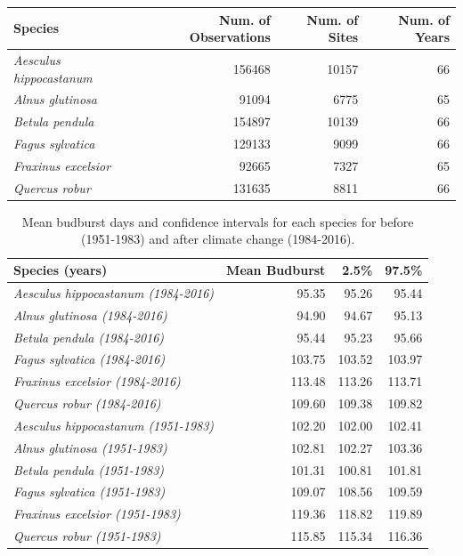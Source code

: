 \documentclass{article}\usepackage[]{graphicx}\usepackage[]{color}
\begin{document}
\begin{center}
 \label{tab:spp} 
\begin{tabular}{l r r r}
\hline
Species & Num. of Observations & Num. of Sites & Num. of Years \\
\hline
\textit{Aesculus hippocastanum} & 156468 & 10157 & 66  \\
\textit{Alnus glutinosa} & 91094 & 6775 & 65 \\
\textit{Betula pendula} & 154897 & 10139 & 66 \\
\textit{Fagus sylvatica} & 129133 & 9099 & 66 \\
\textit{Fraxinus excelsior} & 92665 & 7327 & 65 \\
\textit{Quercus robur} & 131635  & 8811 & 66 \\
\end{tabular}
\end{center}

\vspace{15ex}



\begin{table}[H]
\centering
\caption{Mean budburst days and confidence intervals for each species for before (1951-1983) and after climate change  (1984-2016).} 
\begin{tabular}{lrrr}
  \hline
Species (years) & Mean Budburst & 2.5\% & 97.5\% \\ 
  \hline
\textit{Aesculus hippocastanum (1984-2016)} & 95.35 & 95.26 & 95.44 \\ 
  \textit{Alnus glutinosa (1984-2016)} & 94.90 & 94.67 & 95.13 \\ 
  \textit{Betula pendula (1984-2016)} & 95.44 & 95.23 & 95.66 \\ 
  \textit{Fagus sylvatica (1984-2016)} & 103.75 & 103.52 & 103.97 \\ 
  \textit{Fraxinus excelsior (1984-2016)} & 113.48 & 113.26 & 113.71 \\ 
  \textit{Quercus robur (1984-2016)} & 109.60 & 109.38 & 109.82 \\ 
  \textit{Aesculus hippocastanum (1951-1983)} & 102.20 & 102.00 & 102.41 \\ 
  \textit{Alnus glutinosa (1951-1983)} & 102.81 & 102.27 & 103.36 \\ 
  \textit{Betula pendula (1951-1983)} & 101.31 & 100.81 & 101.81 \\ 
  \textit{Fagus sylvatica (1951-1983)} & 109.07 & 108.56 & 109.59 \\ 
  \textit{Fraxinus excelsior (1951-1983)} & 119.36 & 118.82 & 119.89 \\ 
  \textit{Quercus robur (1951-1983)} & 115.85 & 115.34 & 116.36 \\ 
   \hline
\end{tabular}
\end{table}
\end{document}
